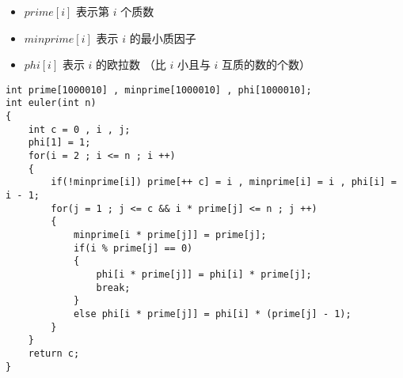 \documentclass[E:/GsjzTle/main/main.tex]{subfiles}
\begin{document}
\begin{itemize}
\item
  \(prime[i]\) 表示第 \(i\) 个质数
\item
  \(minprime[i]\) 表示 \(i\) 的最小质因子
\item
  \(phi[i]\) 表示 \(i\) 的欧拉数 （比 \(i\) 小且与 \(i\)
  互质的数的个数）
\end{itemize}

\begin{lstlisting}
int prime[1000010] , minprime[1000010] , phi[1000010];
int euler(int n)
{
	int c = 0 , i , j;
	phi[1] = 1;
	for(i = 2 ; i <= n ; i ++)
	{
		if(!minprime[i]) prime[++ c] = i , minprime[i] = i , phi[i] = i - 1;
		for(j = 1 ; j <= c && i * prime[j] <= n ; j ++)
		{
			minprime[i * prime[j]] = prime[j];
			if(i % prime[j] == 0)
			{
				phi[i * prime[j]] = phi[i] * prime[j];
				break;
			}
			else phi[i * prime[j]] = phi[i] * (prime[j] - 1);
		}
	}
	return c;
}
\end{lstlisting}
\end{document}
